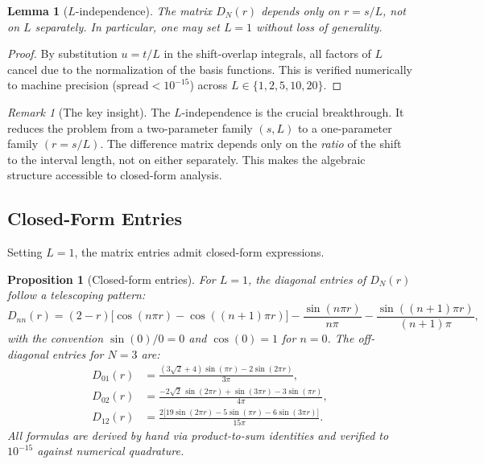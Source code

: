 \documentclass[12pt,a4paper]{article}
\newtheorem{lemma}[theorem]{Lemma}
\newtheorem{proposition}[theorem]{Proposition}
\theoremstyle{definition}
\theoremstyle{remark}
\newtheorem{remark}[theorem]{Remark}
\begin{document}
\begin{lemma}[$L$-independence]
\label{lem:L-indep}
The matrix $D_N(r)$ depends only on $r = s/L$, not on $L$ separately. In particular, one may set $L = 1$ without loss of generality.
\end{lemma}

\begin{proof}
By substitution $u = t/L$ in the shift-overlap integrals, all factors of $L$ cancel due to the normalization of the basis functions. This is verified numerically to machine precision ($\text{spread} < 10^{-15}$) across $L \in \{1, 2, 5, 10, 20\}$.
\end{proof}

\begin{remark}[The key insight]
The $L$-independence is the crucial breakthrough. It reduces the problem from a two-parameter family $(s, L)$ to a one-parameter family $(r = s/L)$. The difference matrix depends only on the \emph{ratio} of the shift to the interval length, not on either separately. This makes the algebraic structure accessible to closed-form analysis.
\end{remark}

\subsection{Closed-Form Entries}

Setting $L=1$, the matrix entries admit closed-form expressions.

\begin{proposition}[Closed-form entries]
\label{prop:closed-form}
For $L = 1$, the diagonal entries of $D_N(r)$ follow a telescoping pattern:
\[
  D_{nn}(r) = (2-r)\bigl[\cos(n\pi r) - \cos((n{+}1)\pi r)\bigr]
  - \frac{\sin(n\pi r)}{n\pi} - \frac{\sin((n{+}1)\pi r)}{(n{+}1)\pi},
\]
with the convention $\sin(0)/0 = 0$ and $\cos(0) = 1$ for $n = 0$. The off-diagonal entries for $N = 3$ are:
\begin{align*}
  D_{01}(r) &= \frac{(3\sqrt{2}+4)\sin(\pi r) - 2\sin(2\pi r)}{3\pi}, \\
  D_{02}(r) &= \frac{-2\sqrt{2}\,\sin(2\pi r) + \sin(3\pi r) - 3\sin(\pi r)}{4\pi}, \\
  D_{12}(r) &= \frac{2\bigl[19\sin(2\pi r) - 5\sin(\pi r) - 6\sin(3\pi r)\bigr]}{15\pi}.
\end{align*}
All formulas are derived by hand via product-to-sum identities and verified to $10^{-15}$ against numerical quadrature.
\end{proposition}
\end{document}
